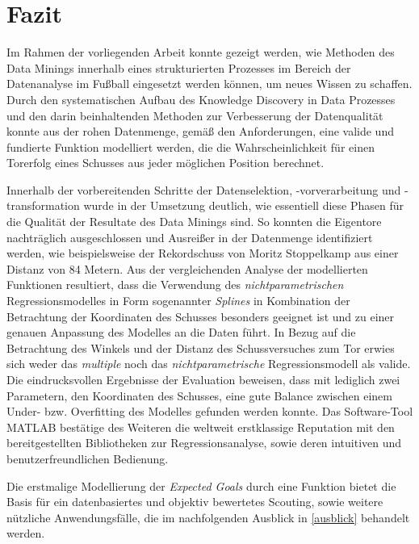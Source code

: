 \section{Fazit}
Im Rahmen der vorliegenden Arbeit konnte gezeigt werden, wie Methoden des Data Minings innerhalb eines strukturierten Prozesses im Bereich der Datenanalyse im Fußball eingesetzt werden können, um neues Wissen zu schaffen. Durch den systematischen Aufbau des Knowledge Discovery in Data Prozesses und den darin beinhaltenden Methoden zur Verbesserung der Datenqualität konnte aus der rohen Datenmenge, gemäß den Anforderungen, eine valide und fundierte Funktion modelliert werden, die die Wahrscheinlichkeit für einen Torerfolg eines Schusses aus jeder möglichen Position berechnet. 

Innerhalb der vorbereitenden Schritte der Datenselektion, -vorverarbeitung und -transformation wurde in der Umsetzung deutlich, wie essentiell diese Phasen für die Qualität der Resultate des Data Minings sind. So konnten die Eigentore nachträglich ausgeschlossen und Ausreißer in der Datenmenge identifiziert werden, wie beispielsweise der Rekordschuss von Moritz Stoppelkamp aus einer Distanz von 84 Metern. Aus der vergleichenden Analyse der modellierten Funktionen resultiert, dass die Verwendung des \textit{nichtparametrischen} Regressionsmodelles in Form sogenannter \textit{Splines} in Kombination der Betrachtung der Koordinaten des Schusses besonders geeignet ist und zu einer genauen Anpassung des Modelles an die Daten führt. In Bezug auf die Betrachtung des Winkels und der Distanz des Schussversuches zum Tor erwies sich weder das \textit{multiple} noch das \textit{nichtparametrische} Regressionsmodell als valide. Die eindrucksvollen Ergebnisse der Evaluation beweisen, dass mit lediglich zwei Parametern, den Koordinaten des Schusses, eine gute Balance zwischen einem Under- bzw. Overfitting des Modelles gefunden werden konnte. Das Software-Tool MATLAB bestätige des Weiteren die weltweit erstklassige Reputation mit den bereitgestellten Bibliotheken zur Regressionsanalyse, sowie deren intuitiven und benutzerfreundlichen Bedienung. \enlargethispage{2\baselineskip} 

Die erstmalige Modellierung der \textit{Expected Goals} durch eine Funktion bietet die Basis für ein datenbasiertes und objektiv bewertetes Scouting, sowie weitere nützliche Anwendungsfälle, die im nachfolgenden Ausblick in \vref{ausblick} behandelt werden.

